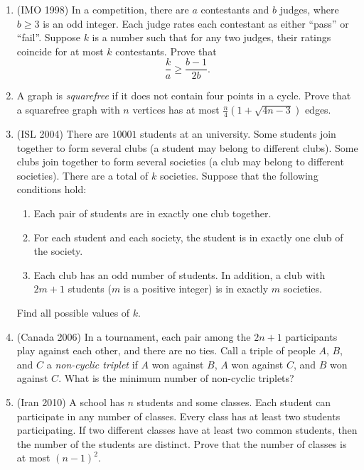 \documentclass[11pt,paper=letter]{scrartcl}
\begin{document}
\begin{enumerate}

\item (IMO 1998) In a competition, there are $a$ contestants and $b$ judges, where $b \ge 3$ is an odd integer. Each judge rates each contestant as either ``pass'' or ``fail''. Suppose $k$ is a number such that for any two judges, their ratings coincide for at most $k$ contestants. Prove that \[
  \frac{k}{a} \ge \frac{b-1}{2b}.
\] \hints{\ref{h:1} \ref{h:2}}

\item A graph is \textit{squarefree} if it does not contain four points in a cycle. Prove that a squarefree graph with $n$ vertices has at most $\frac{n}{4}\left(1 + \sqrt{4n - 3}\right)$ edges. \hints{\ref{h:3} \ref{h:4}}

\item (ISL 2004) There are $10001$ students at an university. Some students join together to form several clubs (a student may belong to different clubs). Some clubs join together to form several societies (a club may belong to different societies). There are a total of $k$ societies. Suppose that the following conditions hold:
\begin{enumerate}
  \item Each pair of students are in exactly one club together.
  \item For each student and each society, the student is in exactly one club of the society.
  \item Each club has an odd number of students. In addition, a club with $2m+1$ students ($m$ is a positive integer) is
in exactly $m$ societies.
\end{enumerate}
Find all possible values of $k$. \hints{\ref{h:7} \ref{h:8}}

\item (Canada 2006) In a tournament, each pair among the $2n + 1$ participants play against each other, and there are no ties. Call a triple of people $A$, $B$, and $C$ a \textit{non-cyclic triplet} if $A$ won against $B$, $A$ won against $C$, and $B$ won against $C$. What is the minimum number of non-cyclic triplets?  \hint{\ref{h:9}}

\item (Iran 2010) A school has $n$ students and some classes. Each student can participate in any number of classes. Every class has at least two students participating. If two different classes have at least two common students, then the number of the students are distinct. Prove that the number of classes is at most $\left(n-1\right)^2$.  \hint{\ref{h:10}}


\end{enumerate}
\end{document}

